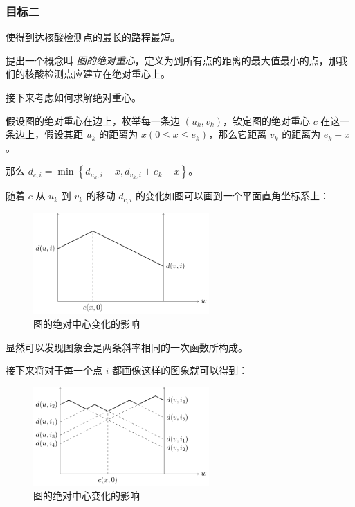 \documentclass{cumcmthesis}
\begin{document}
\subsubsection{目标二}

使得到达核酸检测点的最长的路程最短。

提出一个概念叫 \emph{图的绝对重心}，定义为到所有点的距离的最大值最小的点，那我们的核酸检测点应建立在绝对重心上。

接下来考虑如何求解绝对重心。

假设图的绝对重心在边上，枚举每一条边 $(u_k,v_k)$，钦定图的绝对重心 $c$ 在这一条边上，假设其距 $u_k$ 的距离为 $x(0 \le x \le e_k)$，那么它距离 $v_k$ 的距离为 $e_k - x$。

那么 $d_{c,i} = \min\left\{d_{u_k, i} + x, d_{v_k,i} + e_k - x\right\}$。

随着 $c$ 从 $u_k$ 到 $v_k$ 的移动 $d_{c,i}$ 的变化如图可以画到一个平面直角坐标系上：

\begin{figure}[H]
	\centering
	\includegraphics[width=0.6\textwidth,height=0.4\textwidth]{images/mdst-plot1.png}
	\caption{图的绝对中心变化的影响}
	\label{fig:mdst-graph}
\end{figure}

显然可以发现图象会是两条斜率相同的一次函数所构成。

接下来将对于每一个点 $i$ 都画像这样的图象就可以得到：

\begin{figure}[H]
	\centering
	\includegraphics[width=0.6\textwidth,height=0.4\textwidth]{images/mdst-plot2.png}
	\caption{图的绝对中心变化的影响}
	\label{fig:mdst-graph}
\end{figure}
\end{document}
